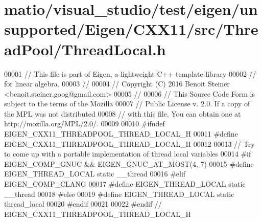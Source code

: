 \hypertarget{matio_2visual__studio_2test_2eigen_2unsupported_2_eigen_2_c_x_x11_2src_2_thread_pool_2_thread_local_8h_source}{}\section{matio/visual\+\_\+studio/test/eigen/unsupported/\+Eigen/\+C\+X\+X11/src/\+Thread\+Pool/\+Thread\+Local.h}
\label{matio_2visual__studio_2test_2eigen_2unsupported_2_eigen_2_c_x_x11_2src_2_thread_pool_2_thread_local_8h_source}

\begin{DoxyCode}
00001 \textcolor{comment}{// This file is part of Eigen, a lightweight C++ template library}
00002 \textcolor{comment}{// for linear algebra.}
00003 \textcolor{comment}{//}
00004 \textcolor{comment}{// Copyright (C) 2016 Benoit Steiner <benoit.steiner.goog@gmail.com>}
00005 \textcolor{comment}{//}
00006 \textcolor{comment}{// This Source Code Form is subject to the terms of the Mozilla}
00007 \textcolor{comment}{// Public License v. 2.0. If a copy of the MPL was not distributed}
00008 \textcolor{comment}{// with this file, You can obtain one at http://mozilla.org/MPL/2.0/.}
00009 
00010 \textcolor{preprocessor}{#ifndef EIGEN\_CXX11\_THREADPOOL\_THREAD\_LOCAL\_H}
00011 \textcolor{preprocessor}{#define EIGEN\_CXX11\_THREADPOOL\_THREAD\_LOCAL\_H}
00012 
00013 \textcolor{comment}{// Try to come up with a portable implementation of thread local variables}
00014 \textcolor{preprocessor}{#if EIGEN\_COMP\_GNUC && EIGEN\_GNUC\_AT\_MOST(4, 7)}
00015 \textcolor{preprocessor}{#define EIGEN\_THREAD\_LOCAL static \_\_thread}
00016 \textcolor{preprocessor}{#elif EIGEN\_COMP\_CLANG}
00017 \textcolor{preprocessor}{#define EIGEN\_THREAD\_LOCAL static \_\_thread}
00018 \textcolor{preprocessor}{#else}
00019 \textcolor{preprocessor}{#define EIGEN\_THREAD\_LOCAL static thread\_local}
00020 \textcolor{preprocessor}{#endif}
00021 
00022 \textcolor{preprocessor}{#endif  // EIGEN\_CXX11\_THREADPOOL\_THREAD\_LOCAL\_H}
\end{DoxyCode}
